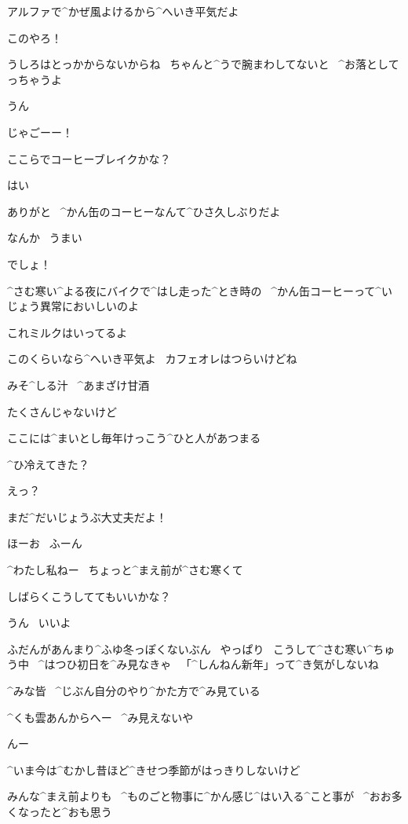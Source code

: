\Takahiro アルファで^{かぜ}{風}よけるから^{へいき}{平気}だよ

\page
\Alpha このやろ！

\Alpha うしろはとっかからないからね
\ ちゃんと^{うで}{腕}まわしてないと
\ ^{お}{落}としてっちゃうよ

\Takahiro うん

\Takahiro じゃごーー！

\page[122]
\Alpha ここらでコーヒーブレイクかな？

\Alpha はい

\Takahiro ありがと
\ ^{かん}{缶}のコーヒーなんて^{ひさ}{久}しぶりだよ

\page
\Takahiro なんか
\ うまい

\Alpha でしょ！

\Alpha ^{さむ}{寒}い^{よる}{夜}にバイクで^{はし}{走}った^{とき}{時}の
\ ^{かん}{缶}コーヒーって^{いじょう}{異常}においしいのよ

\Takahiro これミルクはいってるよ

\Alpha このくらいなら^{へいき}{平気}よ
\ カフェオレはつらいけどね

\page
\Sign みそ^{しる}{汁}
\ ^{あまざけ}{甘酒}

\page
\Alpha たくさんじゃないけど

\Alpha ここには^{まいとし}{毎年}けっこう^{ひと}{人}があつまる

\Alpha ^{ひ}{冷}えてきた？

\Takahiro えっ？

\Takahiro まだ^{だいじょうぶ}{大丈夫}だよ！

\Alpha ほーお
\ ふーん

\Alpha ^{わたし}{私}ねー
\ ちょっと^{まえ}{前}が^{さむ}{寒}くて

\page
\Alpha しばらくこうしててもいいかな？

\Takahiro うん
\ いいよ

\page
\Alpha ふだんがあんまり^{ふゆ}{冬}っぽくないぶん
\ やっぱり
\ こうして^{さむ}{寒}い^{ちゅう}{中}
\ ^{はつひ}{初日}を^{み}{見}なきゃ
\ 「^{しんねん}{新年}」って^{き}{気}がしないね

\page
\Alpha ^{みな}{皆}
\ ^{じぶん}{自分}のやり^{かた}{方}で^{み}{見}ている

\Person ^{くも}{雲}あんからへー
\ ^{み}{見}えないや

\Person んー

\Alpha ^{いま}{今}は^{むかし}{昔}ほど^{きせつ}{季節}がはっきりしないけど

\Alpha みんな^{まえ}{前}よりも
\ ^{ものごと}{物事}に^{かん}{感}じ^{はい}{入}る^{こと}{事}が
\ ^{おお}{多}くなったと^{おも}{思}う

